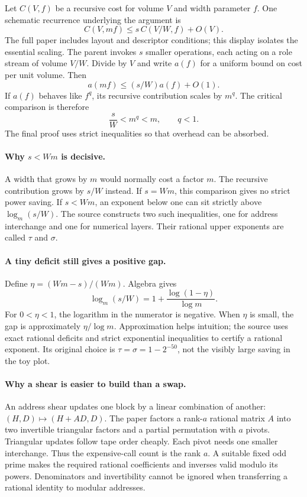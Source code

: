 
Let $C(V,f)$ be a recursive cost for volume $V$ and width parameter $f$.
One schematic recurrence underlying the argument is
\[
 C(V,mf)\le s\,C(V/W,f)+O(V).
\]
The full paper includes layout and descriptor conditions; this display isolates
the essential scaling. The parent invokes $s$ smaller operations, each acting
on a role stream of volume $V/W$. Divide by $V$ and write $a(f)$ for a
uniform bound on cost per unit volume. Then
\[
 a(mf)\le(s/W)a(f)+O(1).
\]
If $a(f)$ behaves like $f^q$, its recursive contribution scales by $m^q$.
The critical comparison is therefore
\[
 \frac{s}{W}<m^q<m,\qquad q<1.
\]
The final proof uses strict inequalities so that overhead can be absorbed.


\paragraph{Why $s<Wm$ is decisive.}
A width that grows by $m$ would normally cost a factor $m$. The recursive
contribution grows by $s/W$ instead. If $s=Wm$, this comparison gives no strict
power saving. If $s<Wm$, an exponent below one can sit strictly above
$\log_m(s/W)$. The source constructs two such inequalities, one for address
interchange and one for numerical layers. Their rational upper exponents are
called $\tau$ and $\sigma$.

\paragraph{A tiny deficit still gives a positive gap.}
Define $\eta=(Wm-s)/(Wm)$. Algebra gives
\[
 \log_m(s/W)=1+\frac{\log(1-\eta)}{\log m}.
\]
For $0<\eta<1$, the logarithm in the numerator is negative. When $\eta$ is
small, the gap is approximately $\eta/\log m$. Approximation helps intuition;
the source uses exact rational deficits and strict exponential inequalities to
certify a rational exponent. Its original choice is
$\tau=\sigma=1-2^{-50}$, not the visibly large saving in the toy plot.

\paragraph{Why a shear is easier to build than a swap.}
An address shear updates one block by a linear combination of another:
$(H,D)\mapsto(H+AD,D)$. The paper factors a rank-$a$ rational matrix $A$
into two invertible triangular factors and a partial permutation with $a$
pivots. Triangular updates follow tape order cheaply. Each pivot needs one
smaller interchange. Thus the expensive-call count is the rank $a$.
A suitable fixed odd prime makes the required rational coefficients and
inverses valid modulo its powers. Denominators and invertibility cannot be
ignored when transferring a rational identity to modular addresses.

